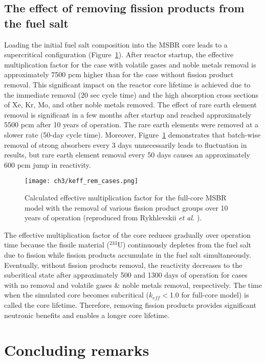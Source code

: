 \subsection{The effect of removing fission products from the fuel salt}
Loading the initial fuel salt composition into the \gls{MSBR} core leads to a 
supercritical configuration (Figure~\ref{fig:fp_removal}). After reactor 
startup, the effective multiplication factor for the case with volatile gases 
and noble metals removal is approximately 7500 pcm  higher than for the case 
without fission product removal. This significant impact on the reactor core 
lifetime is achieved due to the immediate removal (20 sec cycle time) and the 
high absorption cross sections of Xe, Kr, Mo, and other noble metals removed. 
The effect of rare earth element removal is significant in a few months after 
startup and reached approximately 5500 pcm after 10 years of operation. The 
rare earth elements were removed at a slower rate (50-day cycle time). 
Moreover, Figure~\ref{fig:fp_removal} demonstrates that batch-wise removal of 
strong absorbers every 3 days unnecessarily leads to fluctuation in results, 
but rare earth element removal every 50 days causes an approximately 600 pcm 
jump in reactivity.
\begin{figure}[ht!] %
	\centering
	\texttt{[image: ch3/keff\_rem\_cases.png]} 
	\caption{Calculated effective multiplication factor for the full-core 
		\gls{MSBR} model with the removal of various fission product groups 
		over 10 years of operation (reproduced from Rykhlevskii \emph{et al.} 
		\cite{rykhlevskii_modeling_2019}).}
	\label{fig:fp_removal}
\end{figure}

The effective multiplication factor of the core reduces gradually over 
operation time because the fissile material ($^{233}$U) continuously depletes 
from the fuel salt due to fission while fission products accumulate in the 
fuel salt simultaneously. Eventually, without fission products removal, the 
reactivity decreases to the subcritical state after approximately 500 and 
1300 days of operation for cases with no removal and volatile gases \& noble 
metals removal, respectively. The time when the simulated core becomes  
subcritical ($k_{eff}<$1.0 for full-core model) is called the core 
lifetime. Therefore, removing fission products provides significant 
neutronic benefits and enables a longer core lifetime.


\section{Concluding remarks}

